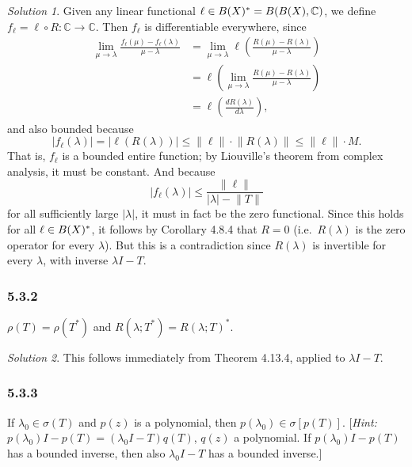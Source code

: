 \documentclass{report}
\newcommand{\bb}[1]{\mathbb{#1}}
\newcommand{\norm}[1]{{\lVert #1 \rVert}}
\let\sc\relax
\newcommand{\sc}[1]{\mathscr{#1}}
\theoremstyle{remark}
\newtheorem*{solution}{Solution}
\begin{document}
\begin{solution}
  Given any linear functional $\ell \in \sc B(X)^* = \sc B(\sc B(X), \bb C)$, we define $f_\ell = \ell \circ R: \bb C \to \bb C$. Then $f_\ell$ is differentiable everywhere, since
  \begin{equation*}
    \begin{split}
      \lim_{\mu \to \lambda} \frac{f_\ell(\mu) - f_\ell(\lambda)}{\mu - \lambda} &= \lim_{\mu \to \lambda} \ell \left( \frac{R(\mu) - R(\lambda)}{\mu - \lambda} \right) \\
      &= \ell \left( \lim_{\mu \to \lambda} \frac{R(\mu) - R(\lambda)}{\mu - \lambda} \right) \\
      &= \ell\left( \frac{d R(\lambda)}{d \lambda} \right),
    \end{split}
  \end{equation*}
  and also bounded because
  \begin{equation*}
    |f_\ell(\lambda)| = |\ell(R(\lambda))| \le \norm \ell \cdot \norm{R(\lambda)} \le \norm \ell \cdot M.
  \end{equation*}
  That is, $f_\ell$ is a bounded entire function; by Liouville's theorem from complex analysis, it must be constant. And because
  \begin{equation*}
    |f_\ell(\lambda)| \le \frac{\norm \ell}{|\lambda| - \norm T}
  \end{equation*}
  for all sufficiently large $|\lambda|$, it must in fact be the zero functional. Since this holds for all $\ell \in \sc B(X)^*$, it follows by Corollary 4.8.4 that $R = 0$ (i.e.\ $R(\lambda)$ is the zero operator for every $\lambda$). But this is a contradiction since $R(\lambda)$ is invertible for every $\lambda$, with inverse $\lambda I - T$.
\end{solution}

\subsubsection*{5.3.2}
$\rho(T) = \rho(T^*)$ and $R(\lambda; T^*) = R(\lambda;T)^*$.

\begin{solution}
  This follows immediately from Theorem 4.13.4, applied to $\lambda I - T$.
\end{solution}

\subsubsection*{5.3.3}
If $\lambda_0 \in \sigma(T)$ and $p(z)$ is a polynomial, then $p(\lambda_0) \in \sigma[p(T)]$. [\emph{Hint:} $p(\lambda_0)I - p(T) = (\lambda_0 I - T)q(T)$, $q(z)$ a polynomial. If $p(\lambda_0)I - p(T)$ has a bounded inverse, then also $\lambda_0 I - T$ has a bounded inverse.]
\end{document}

